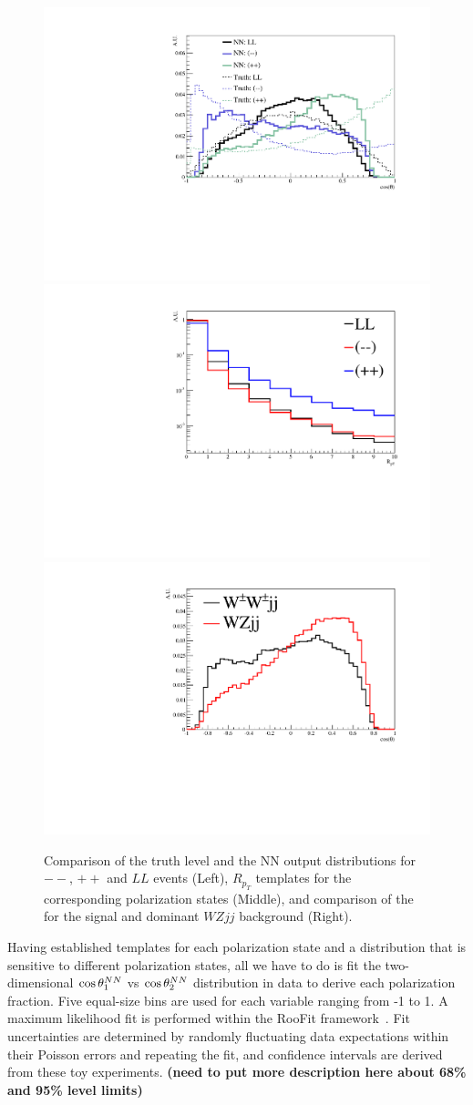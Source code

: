 \begin{figure}
\includegraphics[width=.32\textwidth]{./fig/1d_templates_graph_X.pdf}
\includegraphics[width=.32\textwidth]{./fig/ratios_LLRROO_graph.pdf}
\includegraphics[width=.32\textwidth]{./fig/1d_wz_bg_graph_X.pdf}
\caption{\label{fig:polarization_comparison} Comparison of the truth level \cts and the 
NN output \ctsNN distributions for $--$, $++$ and $LL$ events (Left), 
$R_{p_T}$ templates for the corresponding polarization states (Middle), 
and comparison of the \ctsNN for the signal and dominant $WZjj$ background (Right).}
\end{figure}

Having established templates for each polarization state and a
distribution that is sensitive to different polarization states, all
we have to do is fit the two-dimensional $ \cos \theta^{NN}  _1$ vs $ \cos \theta^{NN}  _2$
distribution in data to derive each polarization fraction. Five equal-size bins 
are used for each \ctsNN variable ranging from -1 to 1. A maximum likelihood fit is performed 
within the RooFit framework~\cite{aa}. Fit uncertainties are determined by randomly
fluctuating data expectations within their Poisson errors and
repeating the fit, and confidence intervals are derived from these toy experiments.  
{\bf (need to put more description here about 68\% and 95\% level limits)}

